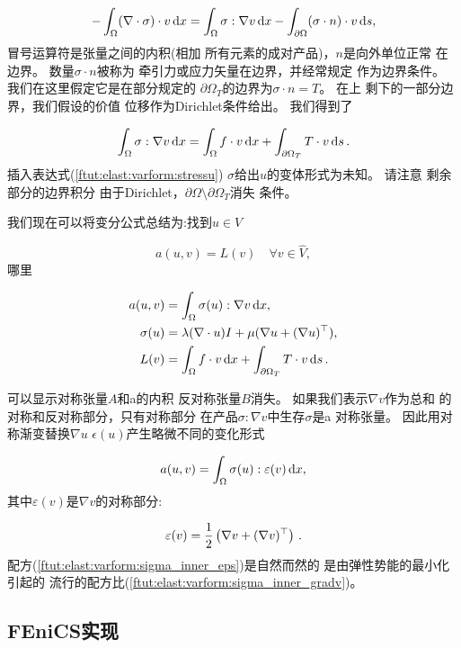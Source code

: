 \[ -\int_\Omega (\nabla\cdot\sigma) \cdot v \, \mathrm{d}x
= \int_\Omega \sigma : \nabla v\, \mathrm{d}x - \int_{\partial\Omega}
(\sigma\cdot n)\cdot v \, \mathrm{d}s,\]
冒号运算符是张量之间的内积(相加
所有元素的成对产品)，$n$是向外单位正常
在边界。 数量$\sigma\cdot n$被称为
牵引力或应力矢量在边界，并经常规定
作为边界条件。 我们在这里假定它是在部分规定的
$\partial\Omega_T$的边界为$\sigma\cdot n = T$。 在上
剩下的一部分边界，我们假设的价值
位移作为Dirichlet条件给出。 我们得到了

\[
\int_\Omega \sigma : \nabla v \, \mathrm{d}x =
\int_\Omega f\cdot v \, \mathrm{d}x
+ \int_{\partial\Omega_T} T\cdot v\, \mathrm{d}s\thinspace .\]
插入表达式(\ref{ftut:elast:varform:stressu})
$\sigma$给出$u$的变体形式为未知。 请注意
剩余部分的边界积分
由于Dirichlet，$\partial\Omega\setminus\partial\Omega_T$消失
条件。

我们现在可以将变分公式总结为:找到$u\in V$

\begin{equation}
a(u,v) = L(v)\quad\forall v\in\hat{V},
\end{equation}
哪里

\begin{align}
a(u,v) &= \int_\Omega\sigma(u) :\nabla v \, \mathrm{d}x,
\label{ftut:elast:varform:sigma_inner_gradv}
\\
\sigma(u) &= \lambda(\nabla\cdot u)I + \mu(\nabla u + (\nabla u)^{\top}),\\
L(v) &= \int_\Omega f\cdot v\, \mathrm{d}x + \int_{\partial\Omega_T}
T\cdot v\, \mathrm{d}s\thinspace .
\end{align}

可以显示对称张量$A$和a的内积
反对称张量$B$消失。 如果我们表示$\nabla v$作为总和
的对称和反对称部分，只有对称部分
在产品$\sigma :\nabla v$中生存$\sigma$是a
对称张量。 因此用对称渐变替换$\nabla u$
$\epsilon(u)$产生略微不同的变化形式

\begin{equation}
a(u,v) = \int_\Omega\sigma(u) :\varepsilon(v) \, \mathrm{d}x,
\label{ftut:elast:varform:sigma_inner_eps}
\end{equation}
其中$\varepsilon(v)$是$\nabla v$的对称部分:

\[ \varepsilon(v) = \frac{1}{2}\left(\nabla v + (\nabla v)^{\top}\right)\thinspace .\]
配方(\ref{ftut:elast:varform:sigma_inner_eps})是自然而然的
是由弹性势能的最小化引起的
流行的配方比(\ref{ftut:elast:varform:sigma_inner_gradv})。

\subsection{FEniCS实现}

